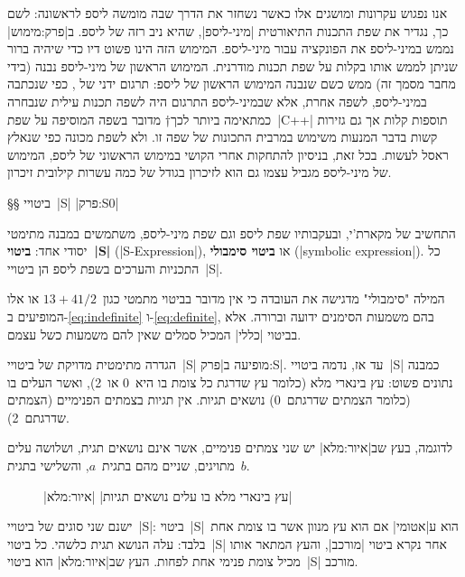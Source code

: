 אנו נפגוש עקרונות ומושגים אלו כאשר נשחזר את הדרך שבה מומשה ליספ לראשונה: לשם
כך, נגדיר את שפת התכנות התיאורטית \ע|מיני-ליספ|, שהיא ניב רזה של ליספ.
ב|פרק:מימוש| נממש במיני-ליספ את הפונקציה  עבור מיני-ליספ. המימוש
הזה הינו פשוט דיו כדי שיהיה ברור שניתן לממש אותו בקלות על שפת תכנות מודרנית.
המימוש הראשון של מיני-ליספ נבנה (בידי מחבר מסמך זה) ממש כשם שנבנה המימוש הראשון
של ליספ:
תרגום ידני של , כפי שנכתבה במיני-ליספ, לשפה אחרת, אלא
שבמיני-ליספ התרגום היה לשפה תכנות עילית שנבחרה כמתאימה ביותר לכך†{%
מדובר בשפה המוסיפה על שפת~\E|C++| תוספות קלות אך גם גזירות קשות בדבר
המנעות משימוש במרבית התכונות של שפה זו.
}
ולא לשפת מכונה כפי שנאלץ ראסל לעשות. בכל זאת, בניסיון להתחקות אחרי הקושי
במימוש הראשוני של ליספ, המימוש של מיני-ליספ מגביל עצמו גם הוא לזיכרון בגודל של
כמה עשרות קילובית זיכרון.

§§ ביטויי~\E|S|
|פרק:S0|

התחשיב של מקארת'י, ובעקבותיו שפת ליספ וגם שפת מיני-ליספ, משתמשים במבנה מתימטי
יסודי אחד: \textbf{ביטוי~\E|S|} (\E|S-Expression|), או \textbf{ביטוי סימבולי}
(\E|symbolic expression|). כל התכניות והערכים בשפת ליספ הן ביטויי~\E|S|.

המילה "סימבולי" מדגישה את העובדה כי אין מדובר בביטוי מתמטי
כגון~$13+41/2$ או אלו המופיעים ב-\ref{eq:indefinite} ו-\ref{eq:definite}, בהם
משמעות הסימנים ידועה וברורה. אלא בביטוי \E|כללי| המכיל סמלים שאין להם
משמעות כשל עצמם.

הגדרה מתימטית מדויקת של ביטויי~\E|S| מופיעה ב|פרק:S|. עד אז, נדמה
ביטויי~\E|S| כמבנה נתונים פשוט: עץ בינארי מלא (כלומר עץ שדרגת כל צומת בו היא~0
או~2), ואשר העלים בו (כלומר הצמתים שדרגתם~0) נושאים תגיות. אין תגיות בצמתים
הפנימיים (הצמתים שדרגתם~2).

לדוגמה, בעץ שב|איור:מלא| יש שני צמתים פנימיים, אשר אינם נושאים תגית, ושלושה
עלים מתויגים, שניים מהם בתגית~$a$, והשלישי בתגית~$b$.

\begin{figure}[H]
  \centering
  \begin{LTR}
 \begin{quote}
   \scriptsize
  \center
\end{quote}
\end{LTR}
  |עץ בינארי מלא בו עלים נושאים תגיות|
  |איור:מלא|
\end{figure}

ישנם שני סוגים של ביטויי~\E|S|: ביטוי~\E|S|\ הוא ע|אטומי| אם הוא עץ מנוון אשר
בו צומת אחת בלבד: עלה הנושא תגית כלשהי. כל ביטוי~\E|S| אחר נקרא ביטוי
\ע|מורכב|, והעץ המתאר אותו מכיל צומת פנימי אחת לפחות. העץ שב|איור:מלא| הוא
ביטוי~\E|S| מורכב.

